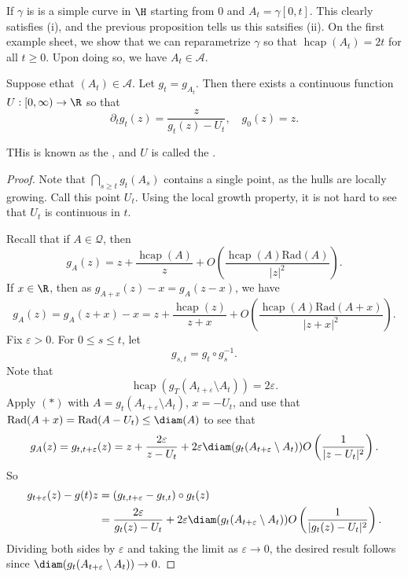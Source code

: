 \documentclass[a4paper]{article}
\DeclareMathOperator\hcap{hcap}
\newcommand\rad{\mathrm{Rad}}
\begin{document}
\begin{eg}
  If $\gamma$ is is a simple curve in $\H$ starting from $0$ and $A_t = \gamma[0, t]$. This clearly satisfies (i), and the previous proposition tells us this satsifies (ii). On the first example sheet, we show that we can reparametrize $\gamma$ so that $\hcap(A_t) = 2t$ for all $t \geq 0$. Upon doing so, we have $A_t \in \mathcal{A}$.
\end{eg}

\begin{thm} %
  Suppose ethat $(A_t) \in \mathcal{A}$. Let $g_t = g_{A_t}$. Then there exists a continuous function $U: [0, \infty) \to \R$ so that
  \[
    \partial_t g_t (z) = \frac{z}{g_t(z) - U_t},\quad g_0(z) = z.
  \]
\end{thm}
THis is known as the , and $U$ is called the .

\begin{proof}
  Note that $\bigcap_{s \geq t} g_t(A_s)$ contains a single point, as the hulls are locally growing. Call this point $U_t$. Using the local growth property, it is not hard to see that $U_t$ is continuous in $t$.

  Recall that if $A \in \mathcal{Q}$, then
  \[
    g_A(z) = z + \frac{\hcap(A)}{z} + O\left(\frac{\hcap(A) \rad(A)}{|z|^2}\right).
  \]
  If $x \in \R$, then as $g_{A + x}(z) - x = g_A(z - x)$, we have
  \[
    g_A(z) = g_A(z + x) - x = z + \frac{\hcap(z)}{z + x} + O\left(\frac{\hcap(A) \rad(A + x)}{|z + x|^2}\right).\tag{$*$}
  \]
  Fix $\varepsilon > 0$. For $0 \leq s \leq t$, let
  \[
    g_{s, t} = g_t \circ g_s^{-1}.
  \]
  Note that
  \[
    \hcap(g_T(A_{t + \varepsilon} \setminus A_t)) = 2 \varepsilon.
  \]
  Apply $(*)$ with $A = g_t(A_{t + \varepsilon} \setminus A_t)$, $x = -U_t$, and use that $\rad(A + x) = \rad(A - U_t) \leq \diam(A)$ to see that
  \[
    g_A(z) = g_{t, t + \varepsilon}(z) = z + \frac{2\varepsilon}{z - U_t} + 2 \varepsilon \diam(g_t(A_{t + \varepsilon} \setminus A_t))O\left(\frac{1}{|z - U_t|^2}\right).
  \]
  So
  \begin{align*}
    g_{t + \varepsilon}(z) - g(t)z &= (g_{t, t + \varepsilon} - g_{t, t}) \circ g_t(z)\\
    &= \frac{2\varepsilon}{g_t(z) - U_t} + 2\varepsilon \diam(g_t(A_{t + \varepsilon} \setminus A_t)) O\left(\frac{1}{|g_t(z) - U_t|^2}\right).
  \end{align*}
  Dividing both sides by $\varepsilon$ and taking the limit as $\varepsilon \to 0$, the desired result follows since $\diam(g_t(A_{t + \varepsilon} \setminus A_t)) \to 0$.
\end{proof}
\end{document}
